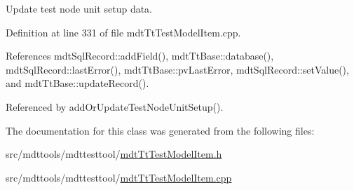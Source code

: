 Update test node unit setup data. 



Definition at line 331 of file mdt\-Tt\-Test\-Model\-Item.\-cpp.



References mdt\-Sql\-Record\-::add\-Field(), mdt\-Tt\-Base\-::database(), mdt\-Sql\-Record\-::last\-Error(), mdt\-Tt\-Base\-::pv\-Last\-Error, mdt\-Sql\-Record\-::set\-Value(), and mdt\-Tt\-Base\-::update\-Record().



Referenced by add\-Or\-Update\-Test\-Node\-Unit\-Setup().



The documentation for this class was generated from the following files\-:\begin{DoxyCompactItemize}
\item 
src/mdttools/mdttesttool/\hyperlink{mdt_tt_test_model_item_8h}{mdt\-Tt\-Test\-Model\-Item.\-h}\item 
src/mdttools/mdttesttool/\hyperlink{mdt_tt_test_model_item_8cpp}{mdt\-Tt\-Test\-Model\-Item.\-cpp}\end{DoxyCompactItemize}
